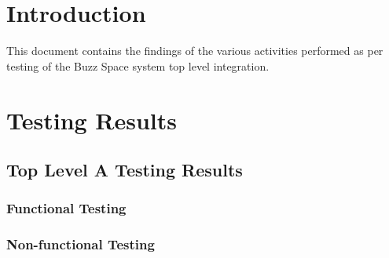 \documentclass[hidelinks, 12pt, oneside]{article}
\begin{document}
\tableofcontents

\newpage

\section{Introduction}
This document contains the findings of the various activities performed as per testing of the Buzz Space system top level integration.

\section{Testing Results}
\subsection{Top Level A Testing Results}
\subsubsection{Functional Testing}
\subsubsection{Non-functional Testing} 
\end{document}
